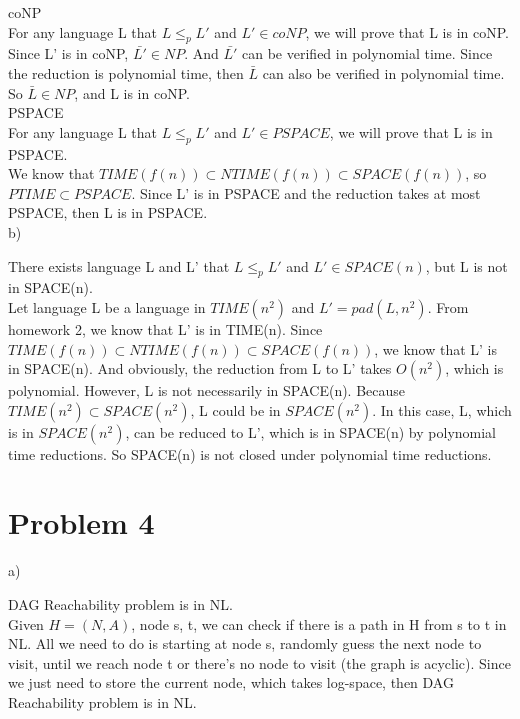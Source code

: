 \documentclass[12pt]{article}
\begin{document}
coNP \\

For any language L that $L \le_p L'$ and $L' \in coNP$, we will prove
that L is in coNP. \\

Since L' is in coNP, $\bar {L'} \in NP$. And $\bar {L'}$ can be
verified in polynomial time. Since the reduction is polynomial time,
then $\bar {L}$ can also be verified in polynomial time. So $\bar {L}
\in NP$, and L is in coNP. \\

PSPACE \\

For any language L that $L \le_p L'$ and $L' \in PSPACE$, we will
prove that L is in PSPACE. \\

We know that $TIME(f(n)) \subset NTIME(f(n)) \subset SPACE(f(n))$, so
$PTIME \subset PSPACE$. Since L' is in PSPACE and the reduction takes
at most PSPACE, then L is in PSPACE. \\

b)

There exists language L and L' that $L \le_p L'$ and $L' \in
SPACE(n)$, but L is not in SPACE(n). \\

Let language L be a language in $TIME(n^2)$ and $L' = pad(L,
n^2)$. From homework 2, we know that L' is in TIME(n). Since
$TIME(f(n)) \subset NTIME(f(n)) \subset SPACE(f(n))$, we know that L'
is in SPACE(n). And obviously, the reduction from L to L' takes 
$O(n^2)$, which is polynomial. However, L is not necessarily in
SPACE(n). Because $TIME(n^2) \subset SPACE(n^2)$, L could be in
$SPACE(n^2)$. In this case, L, which is in $SPACE(n^2)$, can be
reduced to L', which is in SPACE(n) by polynomial time reductions. So
SPACE(n) is not closed under polynomial time reductions.

\section*{Problem 4}

a)

DAG Reachability problem is in NL. \\

Given $H = (N,A)$, node s, t, we can check if there is a path in H
from s to t in NL. All we need to do is starting at node s, randomly
guess the next node to visit, until we reach node t or there's no node
to visit (the graph is acyclic). Since we just need to store the
current node, which takes log-space, then DAG Reachability problem is
in NL. \\
\end{document}

